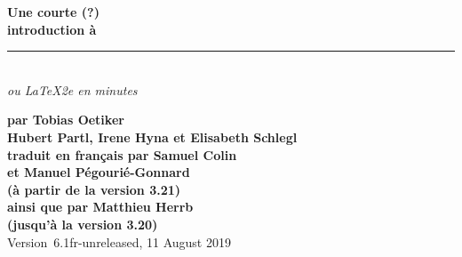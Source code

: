 

\ifpdf
\fi
\newlength{\centeroffset}
\setlength{\centeroffset}{-0.5\oddsidemargin}
\addtolength{\centeroffset}{0.5\evensidemargin}
\addtolength{\textwidth}{-\centeroffset}
\thispagestyle{empty}
\noindent\hspace*{\centeroffset}%
\begin{minipage}{\textwidth}
\parindent=0pt
\flushright
{\Huge\bfseries Une courte (?)\\ 
introduction à \LaTeXe}\\
\rule[-1ex]{\textwidth}{5pt}\\[2.5ex]
\emph{\Large ou \LaTeX2e en \pageref{LastPage} minutes}\\[2ex]
\end{minipage}

\noindent\hspace*{\centeroffset}\begin{minipage}{\textwidth}
\flushright
{\bfseries 
par Tobias Oetiker\\[1.5ex]
Hubert Partl, Irene Hyna et  Elisabeth Schlegl\\[1.5ex]
traduit en français par Samuel Colin\\
  et Manuel Pégourié-Gonnard\\
(à partir de la version 3.21)\\[3ex]
ainsi que par Matthieu Herrb\\
(jusqu'à la version 3.20)\\[3ex]}
Version~6.1fr-unreleased, 11 August 2019
\end{minipage}
\addtolength{\textwidth}{\centeroffset}


\pagebreak

\endinput


%

